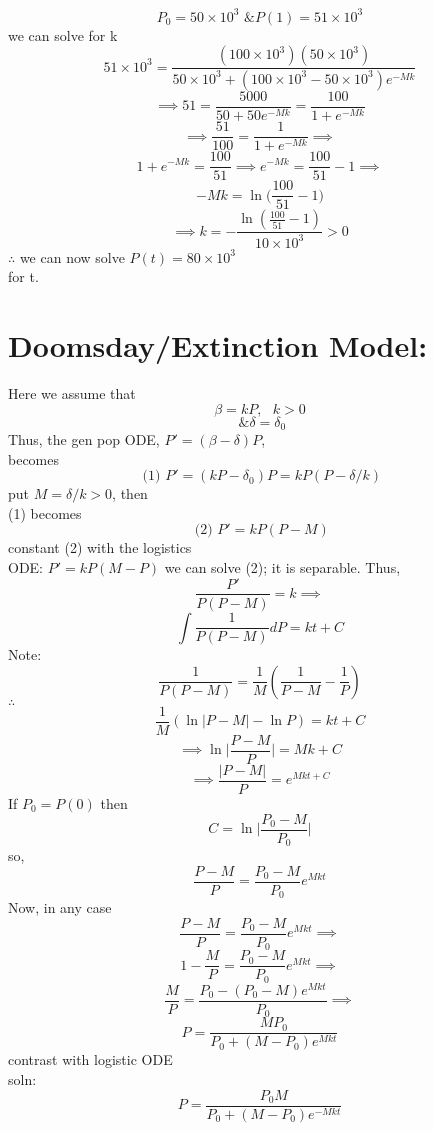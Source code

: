   \[ P_0 = 50 \times 10^3 \text{ \&   } P(1) = 51 \times 10^3 \]
  we can solve for k
  \[ 51 \times 10^3 = \frac{(100 \times 10^3) (50 \times 10^3)}{ 50
  \times 10^3 + (100 \times 10^3 - 50 \times 10^3) e^{-Mk}} \]
  \[ \implies 51 = \frac{5000}{50 +50e^{-Mk}} = \frac{100}{1+e^{-Mk}} \]
  \[ \implies \frac{51}{100} = \frac{1}{1+e^{-Mk}} \implies  \]
  \[  1+ e^{-Mk} = \frac{100}{51} \implies  e^{-Mk} = \frac{100}{51} -1
  \implies \]
  \[ -Mk = \ln \bigg( \frac{100}{51} -1 \bigg) \]
  \[ \implies k= - \frac{\ln ( \frac{100}{51} - 1)}{10 \times 10^3} > 0 \]
  \( \therefore  \) we can now solve \( P(t) = 80 \times 10^3 \) \\
  for t. \\

\section*{Doomsday/Extinction Model:} 
  Here we assume that 
  \[ \beta = kP, \text{  } k>0 \]
  \[ \text{ \& } \delta  = \delta_0 \]
  Thus, the gen pop ODE, \( P' = (\beta -\delta )P \), \\
  becomes \\
  \[ \text{ (1) } P' = (kP-\delta_0)P = kP(P-\delta/k )  \]
  put \( M = \delta / k > 0 \), then \\
  (1) becomes 
  \[ \text{ (2) } P' = kP(P-M) \]
  constant (2) with the logistics \\
  ODE: \( P' =kP(M-P) \) we 
  can solve (2); it is separable. Thus,
  \[ \frac{P'}{P(P-M)}= k \implies  \]
  \[ \int \frac{1}{P(P-M)}dP = kt + C \]
  Note:
  \[ \frac{1}{P(P-M)} = \frac{1}{M}( \frac{1}{P-M}- \frac{1}{P}) \]
  \( \therefore  \)
  \[ \frac{1}{M}( \ln|P-M| - \ln P ) = kt + C \]
  \[ \implies \ln  \bigg| \frac{P-M}{P}\bigg| = Mk + C \]
  \[ \implies \frac{|P-M|}{P} = e^{Mkt+C} \]
  If \( P_0 = P(0) \) then 
  \[ C = \ln \bigg|\frac{P_0-M}{P_0}\bigg| \]
  so,
  \[ \frac{P-M}{P} = \frac{P_0-M}{P_0}e^{Mkt} \]
  Now, in any case 
  \[ \frac{P-M}{P} = \frac{P_0 - M}{P_0}e^{Mkt} \implies \]
  \[ 1 - \frac{M}{P} = \frac{P_0-M}{P_0}e^{Mkt} \implies  \]
  \[ \frac{M}{P} = \frac{P_0- (P_0 -M) e^{Mkt} }{P_0} \implies  \]
  \[ \boxed{P = \frac{MP_0}{P_0 + (M-P_0)e^{Mkt}} } \]
  contrast with logistic ODE \\
  soln: 
  \[ P = \frac{P_0M}{P_0 + (M-P_0)e^{-Mkt}} \]


  \newpage
